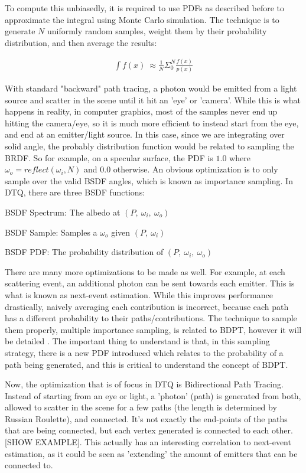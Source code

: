 \message{ !name(test.tex)}\documentclass{article}
\begin{document}
  To compute this unbiasedly, it is required to use PDFs as described before to
approximate the integral using Monte Carlo simulation. The technique is to
generate $N$ uniformly random samples, weight them by their probability
distribution, and then average the results:
  
  \begin{align}
   \int{f(x)} \: \approx \frac{1}{N}\Sigma_0^N{\frac{f(x)}{p(x)}}
  \end{align}
  
  With standard "backward" path tracing, a photon would be emitted from a light
source and scatter in the scene until it hit an 'eye' or 'camera'. While this is
what happens in reality, in computer graphics, most of the samples never end up
hitting the camera/eye, so it is much more efficient to instead start from the
eye, and end at an emitter/light source. In this case, since we are integrating
over solid angle, the probably distribution function would be related to
sampling the BRDF. So for example, on a specular surface, the PDF is $1.0$ where
$\omega_o = reflect(\omega_i, N)$ and $0.0$ otherwise. An obvious optimization
is to only sample over the valid BSDF angles, which is known as importance
sampling. In DTQ, there are three BSDF functions:
  
  \begin{list}{}{}
  \item BSDF Spectrum: The albedo at $(P,\:\omega_i,\:\omega_o)$
  \item BSDF Sample: Samples a $\omega_o$ given $(P,\:\omega_i)$
  \item BSDF PDF: The probability distribution of $(P,\:\omega_i,\:\omega_o)$
  \end{list}
  
  There are many more optimizations to be made as well. For example, at each
scattering event, an additional photon can be sent towards each emitter. This is
what is known as next-event estimation. While this improves performance
drastically, naively averaging each contribution is incorrect, because each path
has a different probability to their paths/contributions. The technique to
sample them properly, multiple importance sampling, is related to BDPT, however
it will be detailed . The important thing to understand is that, in this
sampling strategy, there is a new PDF introduced which relates to the
probability of a path being generated, and this is critical to understand the
concept of BDPT.
  
  Now, the optimization that is of focus in DTQ is Bidirectional Path Tracing.
Instead of starting from an eye or light, a 'photon' (path) is generated from
both, allowed to scatter in the scene for a few paths (the length is determined
by Russian Roulette), and connected. It's not exactly the end-points of the
paths that are being connected, but each vertex generated is connected to each
other. [SHOW EXAMPLE]. This actually has an interesting correlation to
next-event estimation, as it could be seen as 'extending' the amount of emitters
that can be connected to.
  
\end{document}
